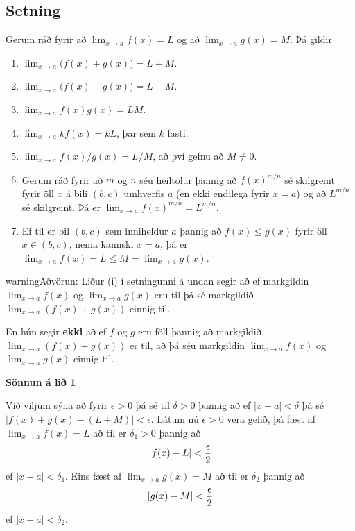 \documentclass[a4paper,10pt,icelandic]{sphinxmanual}
\begin{document}
\subsection{Setning}
\label{kafli02:id3}\label{kafli02:setning-markgildi}
Gerum ráð fyrir að \(\lim_{x\rightarrow a}f(x)=L\) og að
\(\lim_{x\rightarrow a}g(x)=M\). Þá gildir
\begin{enumerate}
\item {} 
\(\lim_{x\rightarrow a}\Big(f(x)+g(x)\Big)=L+M\).

\item {} 
\(\lim_{x\rightarrow a}\Big(f(x)-g(x)\Big)=L-M\).

\item {} 
\(\lim_{x\rightarrow a}f(x)g(x)=LM\).

\item {} 
\(\lim_{x\rightarrow a}kf(x)=kL\), þar sem \(k\) fasti.

\item {} 
\(\lim_{x\rightarrow a}f(x)/g(x)=L/M\), að því gefnu að
\(M\neq 0\).

\item {} 
Gerum ráð fyrir að \(m\) og \(n\) séu heiltölur þannig að
\(f(x)^{m/n}\) sé skilgreint fyrir öll \(x\) á bili
\((b,c)\) umhverfis \(a\) (en ekki endilega fyrir
\(x=a\)) og að \(L^{m/n}\) sé skilgreint. Þá er
\(\lim_{x\rightarrow a}f(x)^{m/n}=L^{m/n}\).

\item {} 
Ef til er bil \((b,c)\) sem inniheldur \(a\) þannig að
\(f(x)\leq g(x)\) fyrir öll \(x\in (b,c)\), nema kannski
\(x=a\), þá er
\(\lim_{x\rightarrow a}f(x)=L\leq M=\lim_{x\rightarrow a}g(x)\).

\end{enumerate}

\begin{notice}{warning}{Aðvörun:}
Liður (i) í setningunni á undan segir að ef markgildin
\(\lim_{x\to a} f(x)\) og \(\lim_{x\to a} g(x)\) eru til þá sé
markgildið \(\lim_{x\to a} (f(x)+g(x))\) einnig til.

En hún segir \textbf{ekki} að ef \(f\) og \(g\) eru föll þannig að
markgildið \(\lim_{x\to a} (f(x)+g(x))\) er til, að þá séu
markgildin \(\lim_{x\to a} f(x)\) og \(\lim_{x\to a} g(x)\)
einnig til.
\end{notice}

\textbf{Sönnun á lið 1}

Við viljum sýna að fyrir \(\epsilon>0\) þá sé til \(\delta>0\)
þannig að ef \(|x-a|<\delta\) þá sé \(|f(x)+g(x) - (L+M)|<\epsilon\).
Látum nú \(\epsilon>0\) vera gefið, þá fæst af
\(\lim_{x\to a} f(x) = L\) að til er \(\delta_1>0\) þannig að
\begin{gather}
\begin{split}|f(x)-L| < \frac \epsilon 2\end{split}\notag
\end{gather}
ef \(|x-a|<\delta_1\). Eins fæst af \(\lim_{x \to a} g(x)=M\)
að til er \(\delta_2\) þannig að
\begin{gather}
\begin{split}|g(x)-M| < \frac \epsilon 2\end{split}\notag
\end{gather}
ef \(|x-a|<\delta_2\).
\end{document}
